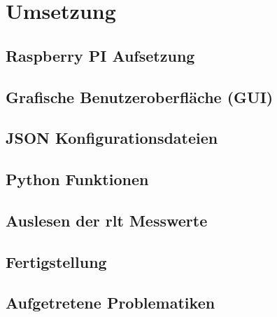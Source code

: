 \ifoot{\pezze}
\chapter{Umsetzung} 

\section{Raspberry PI Aufsetzung}


\newpage
\ifoot{\pezze}
\section{Grafische Benutzeroberfläche (GUI)}\label{gui_design}



\newpage
\ifoot{\pezze}
\section{JSON Konfigurationsdateien}



\newpage
\ifoot{\schneider}


\newpage
\ifoot{\pezze}
\section{Python Funktionen}


\newpage
\ifoot{\schneider}
\section{Auslesen der \acs{rlt} Messwerte}


\section{Fertigstellung}



\newpage
\ifoot{\pezze}



\newpage
\ifoot{\mangeng}
\section{Aufgetretene Problematiken}

